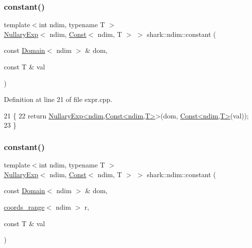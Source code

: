 \subsubsection{\texorpdfstring{constant()}{constant()}\hspace{0.1cm}{\footnotesize\ttfamily [1/2]}}
{\footnotesize\ttfamily template$<$int ndim, typename T $>$ \\
\hyperlink{classshark_1_1ndim_1_1_nullary_exp}{Nullary\+Exp}$<$ ndim, \hyperlink{classshark_1_1ndim_1_1_const}{Const}$<$ ndim, T $>$ $>$ shark\+::ndim\+::constant (\begin{DoxyParamCaption}\item[{const \hyperlink{classshark_1_1ndim_1_1_domain}{Domain}$<$ ndim $>$ \&}]{dom,  }\item[{const T \&}]{val }\end{DoxyParamCaption})}



Definition at line 21 of file expr.\+cpp.


\begin{DoxyCode}
21                                                                                         \{
22     \textcolor{keywordflow}{return} \hyperlink{classshark_1_1ndim_1_1_nullary_exp}{NullaryExp<ndim,Const<ndim,T>}>(dom, 
      \hyperlink{classshark_1_1ndim_1_1_const}{Const<ndim,T>}(val));
23 \}
\end{DoxyCode}
\hypertarget{namespaceshark_1_1ndim_ad9270694b8f4db58c84aff52b048183c}{}\label{namespaceshark_1_1ndim_ad9270694b8f4db58c84aff52b048183c} 
\subsubsection{\texorpdfstring{constant()}{constant()}\hspace{0.1cm}{\footnotesize\ttfamily [2/2]}}
{\footnotesize\ttfamily template$<$int ndim, typename T $>$ \\
\hyperlink{classshark_1_1ndim_1_1_nullary_exp}{Nullary\+Exp}$<$ ndim, \hyperlink{classshark_1_1ndim_1_1_const}{Const}$<$ ndim, T $>$ $>$ shark\+::ndim\+::constant (\begin{DoxyParamCaption}\item[{const \hyperlink{classshark_1_1ndim_1_1_domain}{Domain}$<$ ndim $>$ \&}]{dom,  }\item[{\hyperlink{structshark_1_1ndim_1_1coords__range}{coords\+\_\+range}$<$ ndim $>$}]{r,  }\item[{const T \&}]{val }\end{DoxyParamCaption})}



